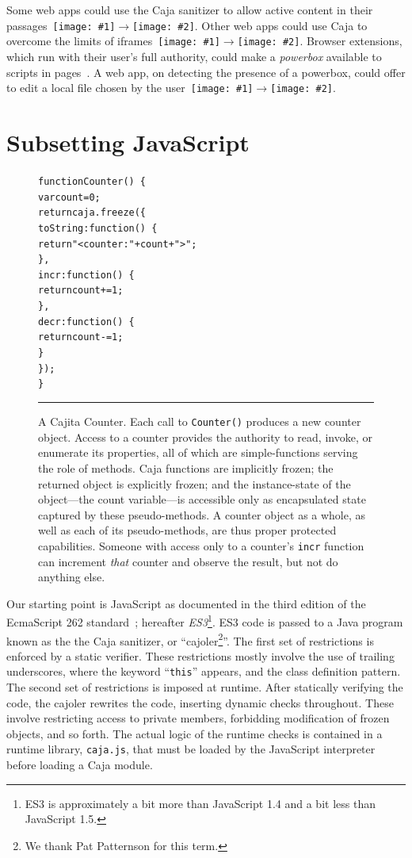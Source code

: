 \documentclass[letterpaper,twocolumn,10pt]{article}
\newcommand{\qq}[2]{{\texttt{[image: \#1]}}$\rightarrow${\texttt{[image: \#2]}}}
\newcommand{\code}[1]{{\tt {#1}}}              %
\begin{document}
Some web apps could use the Caja sanitizer to allow active content in their 
passages~\qq{1}{5}. Other web apps could use Caja to overcome the limits of 
iframes~\qq{3}{5}. Browser extensions, which run with their user's full 
authority, could make a \emph{powerbox} available to scripts in 
pages~\cite{darpareview, stiegler:polaris, seaborn:plash, bitfrost}. A web 
app, on detecting the presence of a powerbox, could offer to edit a local 
file chosen by the user~\qq{4}{6}.

\section{Subsetting JavaScript}
\label{sec:subset}

\begin{figure}[t!]
\begin{alltt}
function Counter()\ \{
  var count = 0;
  return caja.freeze(\{
    toString: function()\ \{ 
      return "<counter: " + count + ">"; 
    \},
    incr: function()\ \{ 
      return count += 1; 
    \},
    decr: function()\ \{ 
      return count -= 1; 
    \}
  \});
\}
\end{alltt}

\caption[A Cajita Counter.]{A Cajita Counter. Each call to \code{Counter()} 
produces a new counter object. Access to a counter provides the authority to 
read, invoke, or enumerate its properties, all of which are simple-functions 
serving the role of methods. Caja functions are implicitly frozen; the 
returned object is explicitly frozen; and the instance-state of the 
object---the count variable---is accessible only as encapsulated state 
captured by these pseudo-methods. A counter object as a whole, as well as 
each of its pseudo-methods, are thus proper protected capabilities. Someone 
with access only to a counter's \code{incr} function can increment 
\emph{that} counter and observe the result, but not do anything else.
 \\ } \hrule
\label{fig:cajita-counter}
\end{figure}



Our starting point is JavaScript as documented in the third edition of the 
EcmaScript 262 standard~\cite{ECMA-262}; hereafter \emph{ES3}\footnote{
%
ES3 is approximately a bit more than JavaScript 1.4 and a bit less than 
JavaScript 1.5.
%
}.  ES3 code is passed to a Java program known as the the Caja sanitizer, 
or ``cajoler\footnote{
%
We thank Pat Patternson for this term.
%
}''.  The first set of restrictions is enforced by a static verifier. 
These restrictions mostly involve the use of trailing underscores, 
where the keyword ``\code{this}'' appears, and the class definition pattern.
The second set of restrictions is imposed at runtime.  After statically 
verifying the code, the cajoler rewrites the code, inserting dynamic 
checks throughout. These involve restricting access to private members, 
forbidding modification of frozen objects, and so forth.  The actual 
logic of the runtime checks is contained in a runtime library, 
\code{caja.js}, that must be loaded by the JavaScript interpreter before 
loading a Caja module.
\end{document}

